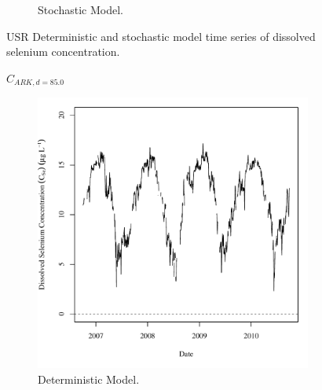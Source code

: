 \begin{linenumbers}
\begin{landscape}
\begin{figure}
\begin{subfigure}{0.7\textwidth}
			\caption{Stochastic Model.}
		\end{subfigure}
		\caption{USR Deterministic and stochastic model time series of dissolved selenium concentration.}
	\end{figure}
\end{landscape}

\subfiguremid
\begin{landscape}
	\begin{figure}
		$ C_{ARK,d=85.0} $
		\begin{subfigure}{0.7\textwidth}
			\centering
			\includegraphics[width=\tableCustomSize]{"Figures/Results_USR/Deterministic/c TS CON"}
			\caption{Deterministic Model.}
		\end{subfigure}%
		\begin{subfigure}{0.7\textwidth}
			\centering

\end{subfigure}
\end{figure}
\end{landscape}
\end{linenumbers}
